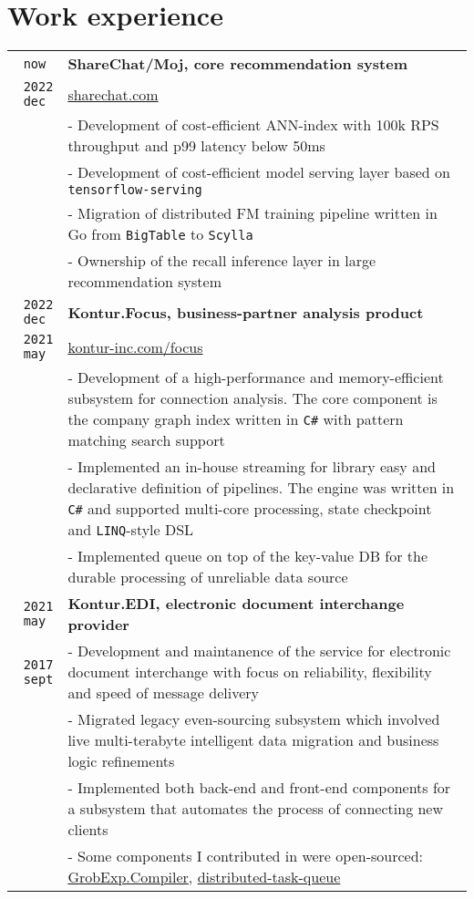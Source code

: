\documentclass[10pt,a4paper]{article}
\begin{document}
\section{Work experience}
\vspace{1mm}
\begin{tabular}{r p{14cm}}
	\texttt{now{ }} & \textbf{ShareChat/Moj, core recommendation system}\\
	\texttt{2022 dec{ }} & \href{https://sharechat.com/}{sharechat.com}\\
	& \small{- Development of cost-efficient ANN-index with 100k RPS throughput and p99 latency below 50ms}\\
	& \small{- Development of cost-efficient model serving layer based on \texttt{tensorflow-serving}}\\
	& \small{- Migration of distributed FM training pipeline written in Go from \texttt{BigTable} to \texttt{Scylla}}\\
	& \small{- Ownership of the recall inference layer in large recommendation system}\\

	\texttt{2022 dec{ }} & \textbf{Kontur.Focus, business-partner analysis product}\\
	\texttt{2021 may{ }} & \href{https://kontur-inc.com/focus}{kontur-inc.com/focus}\\
	& \small{- Development of a high-performance and memory-efficient subsystem for connection analysis. The core component is the company graph index written in \texttt{C\#} with pattern matching search support}\\
	& \small{- Implemented an in-house streaming for library easy and declarative definition of pipelines. The engine was written in \texttt{C\#} and supported multi-core processing, state checkpoint and \texttt{LINQ}-style DSL}\\
	& \small{- Implemented queue on top of the key-value DB for the durable processing of unreliable data source}\\

    \texttt{2021 may{ }} & \textbf{Kontur.EDI, electronic document interchange provider} \\
    \texttt{2017 sept} & \small{- Development and maintanence of the service for electronic document interchange with focus on reliability, flexibility and speed of message delivery}\\
    & \small{- Migrated legacy even-sourcing subsystem which involved live multi-terabyte intelligent data migration and business logic refinements}\\
    & \small{- Implemented both back-end and front-end components for a subsystem that automates the process of connecting new clients}\\
    & \small{- Some components I contributed in were open-sourced: \href{https://github.com/skbkontur/GrobExp.Compiler}{GrobExp.Compiler}, \href{https://github.com/skbkontur/cassandra-distributed-task-queue}{distributed-task-queue}}\\
\end{tabular}
\end{document}
